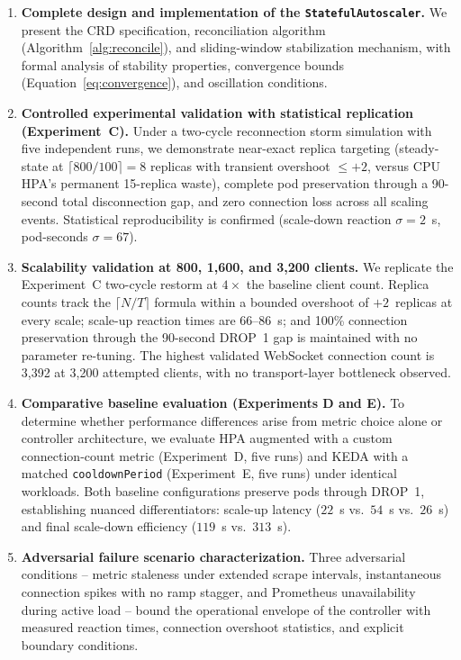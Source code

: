 \documentclass[twocolumn]{svjour3}
\begin{document}
\begin{enumerate}[leftmargin=*]
\item \textbf{Complete design and implementation of the \texttt{StatefulAutoscaler}.}
  We present the CRD specification, reconciliation algorithm (Algorithm~\ref{alg:reconcile}),
  and sliding-window stabilization mechanism, with formal analysis of stability properties,
  convergence bounds (Equation~\ref{eq:convergence}), and oscillation conditions.

\item \textbf{Controlled experimental validation with statistical replication (Experiment~C).}
  Under a two-cycle reconnection storm simulation with five independent runs, we
  demonstrate near-exact replica targeting (steady-state at $\lceil800/100\rceil = 8$
  replicas with transient overshoot $\leq +2$, versus CPU HPA's permanent 15-replica
  waste), complete pod preservation through a 90-second total disconnection gap, and zero
  connection loss across all scaling events. Statistical reproducibility is confirmed
  (scale-down reaction $\sigma = 2$~s, pod-seconds $\sigma = 67$).

\item \textbf{Scalability validation at 800, 1{,}600, and 3{,}200 clients.}
  We replicate the Experiment~C two-cycle restorm at $4\times$ the baseline client count.
  Replica counts track the $\lceil N/T \rceil$ formula within a bounded overshoot of
  $+2$~replicas at every scale; scale-up reaction times are 66--86~s; and 100\% connection
  preservation through the 90-second DROP~1 gap is maintained with no parameter
  re-tuning. The highest validated WebSocket connection count is 3{,}392 at 3{,}200 attempted
  clients, with no transport-layer bottleneck observed.

\item \textbf{Comparative baseline evaluation (Experiments D and E).} To determine
  whether performance differences arise from metric choice alone or controller architecture,
  we evaluate HPA augmented with a custom connection-count metric (Experiment~D, five
  runs) and KEDA with a matched \texttt{cooldownPeriod} (Experiment~E, five runs) under
  identical workloads. Both baseline configurations preserve pods through DROP~1,
  establishing nuanced differentiators: scale-up latency ($22$~s vs.\ $54$~s vs.\ $26$~s) and
  final scale-down efficiency ($119$~s vs.\ $313$~s).

\item \textbf{Adversarial failure scenario characterization.} Three adversarial
  conditions -- metric staleness under extended scrape intervals, instantaneous connection
  spikes with no ramp stagger, and Prometheus unavailability during active load -- bound
  the operational envelope of the controller with measured reaction times, connection
  overshoot statistics, and explicit boundary conditions.


\end{enumerate}
\end{document}
